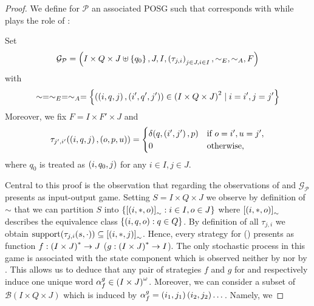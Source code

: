 \begin{proof}
  We define for $\mathcal{P}$ an associated \ac{POSG} such that \eve{} 
  corresponds with \outputp{} while \adam{} plays the role of :
  \begin{definition}
    Set
    \begin{equation*}
      \mathcal{G}_{\mathcal{P}} = \left(I\times Q\times J\uplus\left\{q_{0}\right\}, J,
        I, \left(\tau_{j,i}\right)_{j\in J,i\in I}, \sim_{E}, \sim_{A}, F\right)
    \end{equation*}
    with
    \begin{equation*}
      \sim = \sim_{E} = \sim_{A} = \left\{\left(\left(i, q, j\right), 
      \left(i', q', j'\right)\right)\in \left(I\times Q\times J\right)^{2}\mid i = i', j = j'\right\}
    \end{equation*}
    Moreover, we fix $F = I\times F'\times J$ and
    \begin{equation*}
      \tau_{j',i'}(\left(i, q, j\right), \left(o, p, u\right)) = \begin{cases}
        \delta(q, \left(i', j'\right), p)&\text{if }o = i', u = j',\\
        0&\text{otherwise},
      \end{cases}
    \end{equation*}
    where $q_{0}$ is treated as $\left(i, q_{0}, j\right)$ for any $i\in I, j\in J$.
  \end{definition}
  Central to this proof is the observation that regarding the observations of
  \eve{} and \adam{} $\mathcal{G}_{\mathcal{P}}$ presents as input-output game.
  Setting $S = I\times Q\times J$ we observe by definition of $\sim$ that we 
  can partition $S$ into 
  $\left\{\left[\left(i, *, o\right)\right]_{\sim}:i\in I, o\in J\right\}$ 
  where $\left[\left(i, *, o\right)\right]_{\sim}$ describes the equivalence class
  $\left\{\left(i, q, o\right):q\in Q\right\}$. By definition of all $\tau_{j,i}$ we obtain
  $\operatorname{support}(\tau_{j,i}(s, \cdot))\subseteq\left[\left(i,*,j\right)\right]_{\sim}$. Hence,
  every strategy for \eve{} (\adam{}) presents as function 
  $f:\left(I\times J\right)^{*}\rightarrow J$ 
  ($g:\left(I\times J\right)^{*}\rightarrow I$). The only stochastic process in this
  game is associated with the state component which is observed neither by 
  \eve{} nor by \adam{}. This allows us to deduce that any pair of 
  strategies $f$ and $g$ for \eve{} and \adam{} respectively induce one unique
  word $\alpha_{f}^{g}\in\left(I\times J\right)^{\omega}$. Moreover, we can consider
  a subset of $\mathcal{B}(I\times Q\times J)$ which is induced by 
  $\alpha_{f}^{g} = \left(i_{1}, j_{1}\right)\left(i_{2}, j_{2}\right)\dots$. Namely, we 

\end{proof}

